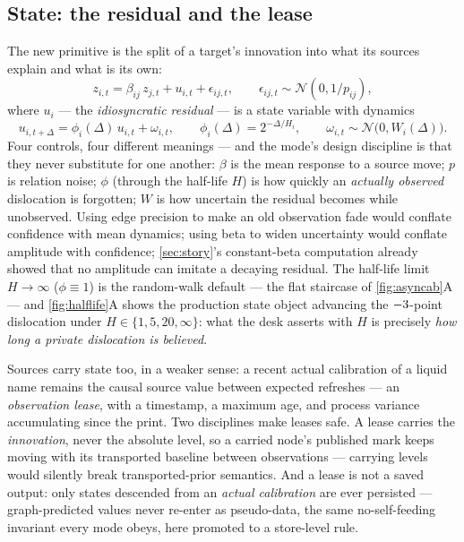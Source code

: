 \documentclass[11pt]{article}
\begin{document}
\subsection{State: the residual and the lease}
\label{sec:state}

The new primitive is the split of a target's innovation into what its
sources explain and what is its own:
\begin{equation}
z_{i,t}=\beta_{ij}\,z_{j,t}+u_{i,t}+\epsilon_{ij,t},
\qquad \epsilon_{ij,t}\sim\mathcal N(0,1/p_{ij}),
\label{eq:directed}
\end{equation}
where $u_i$ --- the \emph{idiosyncratic residual} --- is a state variable
with dynamics
\begin{equation}
u_{i,t+\Delta}=\phi_i(\Delta)\,u_{i,t}+\omega_{i,t},
\qquad
\phi_i(\Delta)=2^{-\Delta/H_i},
\qquad
\omega_{i,t}\sim\mathcal N\big(0,W_i(\Delta)\big).
\label{eq:dynamics}
\end{equation}
Four controls, four different meanings --- and the mode's design
discipline is that they never substitute for one another: $\beta$ is the
mean response to a source move; $p$ is relation noise; $\phi$ (through
the half-life $H$) is how quickly an \emph{actually observed} dislocation
is forgotten; $W$ is how uncertain the residual becomes while unobserved.
Using edge precision to make an old observation fade would conflate
confidence with mean dynamics; using beta to widen uncertainty would
conflate amplitude with confidence; \cref{sec:story}'s constant-beta
computation already showed that no amplitude can imitate a decaying
residual.  The half-life limit $H\to\infty$ ($\phi\equiv1$) is the
random-walk default --- the flat staircase of \cref{fig:asyncab}A --- and
\cref{fig:halflife}A shows the production state object advancing the
$-3$-point dislocation under $H\in\{1,5,20,\infty\}$: what
the desk asserts with $H$ is precisely \emph{how long a private
dislocation is believed}.

Sources carry state too, in a weaker sense: a recent actual calibration
of a liquid name remains the causal source value between expected
refreshes --- an \emph{observation lease}, with a timestamp, a maximum
age, and process variance accumulating since the print.  Two disciplines
make leases safe.  A lease carries the \emph{innovation}, never the
absolute level, so a carried node's published mark keeps moving with its
transported baseline between observations --- carrying levels would
silently break transported-prior semantics.  And a lease is not a saved
output: only states descended from an \emph{actual calibration} are ever
persisted --- graph-predicted values never re-enter as pseudo-data, the
same no-self-feeding invariant every mode obeys, here promoted to a
store-level rule.
\end{document}
